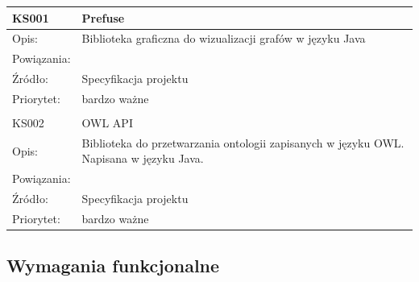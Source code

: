 \begin{center}
\begin{tabular}{|m{3cm}|m{9cm}|} \hline

KS001 & Prefuse \\ \hline
Opis: &  Biblioteka graficzna do wizualizacji grafów w języku Java\\ \hline
Powiązania: &  \\ \hline
Źródło: & Specyfikacja projektu \\ \hline
Priorytet: & bardzo ważne \\ \hline

\multicolumn{2}{c}{} \\
 \hline

KS002 & OWL API \\ \hline
Opis: &  Biblioteka do przetwarzania ontologii zapisanych w języku OWL. Napisana w języku Java.\\ \hline
Powiązania: &  \\ \hline
Źródło: & Specyfikacja projektu \\ \hline
Priorytet: & bardzo ważne \\ \hline


\end{tabular}
\end{center}

\subsection{Wymagania funkcjonalne}


